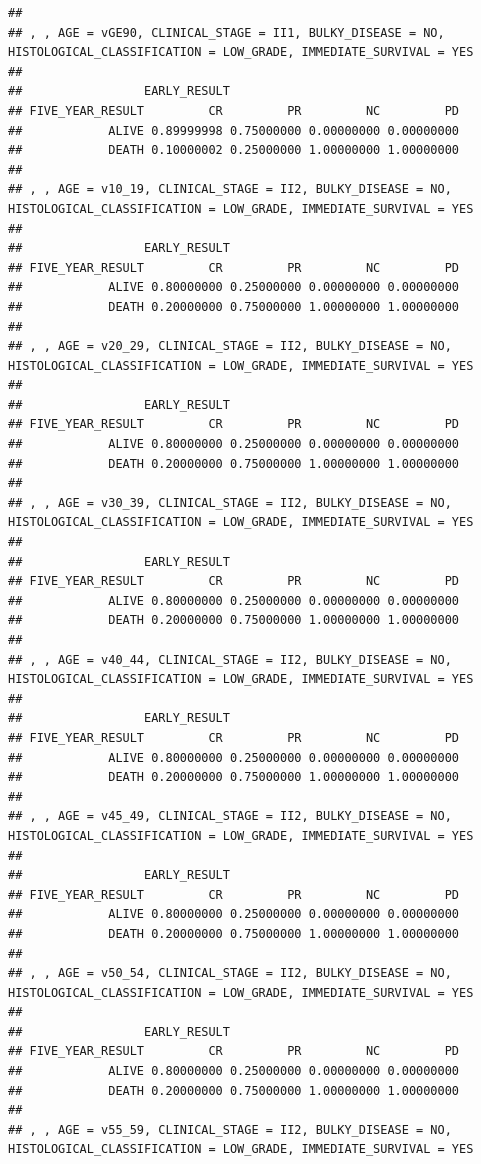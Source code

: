 \documentclass[]{article}
\begin{document}
\begin{verbatim}
## 
## , , AGE = vGE90, CLINICAL_STAGE = II1, BULKY_DISEASE = NO, HISTOLOGICAL_CLASSIFICATION = LOW_GRADE, IMMEDIATE_SURVIVAL = YES
## 
##                 EARLY_RESULT
## FIVE_YEAR_RESULT         CR         PR         NC         PD
##            ALIVE 0.89999998 0.75000000 0.00000000 0.00000000
##            DEATH 0.10000002 0.25000000 1.00000000 1.00000000
## 
## , , AGE = v10_19, CLINICAL_STAGE = II2, BULKY_DISEASE = NO, HISTOLOGICAL_CLASSIFICATION = LOW_GRADE, IMMEDIATE_SURVIVAL = YES
## 
##                 EARLY_RESULT
## FIVE_YEAR_RESULT         CR         PR         NC         PD
##            ALIVE 0.80000000 0.25000000 0.00000000 0.00000000
##            DEATH 0.20000000 0.75000000 1.00000000 1.00000000
## 
## , , AGE = v20_29, CLINICAL_STAGE = II2, BULKY_DISEASE = NO, HISTOLOGICAL_CLASSIFICATION = LOW_GRADE, IMMEDIATE_SURVIVAL = YES
## 
##                 EARLY_RESULT
## FIVE_YEAR_RESULT         CR         PR         NC         PD
##            ALIVE 0.80000000 0.25000000 0.00000000 0.00000000
##            DEATH 0.20000000 0.75000000 1.00000000 1.00000000
## 
## , , AGE = v30_39, CLINICAL_STAGE = II2, BULKY_DISEASE = NO, HISTOLOGICAL_CLASSIFICATION = LOW_GRADE, IMMEDIATE_SURVIVAL = YES
## 
##                 EARLY_RESULT
## FIVE_YEAR_RESULT         CR         PR         NC         PD
##            ALIVE 0.80000000 0.25000000 0.00000000 0.00000000
##            DEATH 0.20000000 0.75000000 1.00000000 1.00000000
## 
## , , AGE = v40_44, CLINICAL_STAGE = II2, BULKY_DISEASE = NO, HISTOLOGICAL_CLASSIFICATION = LOW_GRADE, IMMEDIATE_SURVIVAL = YES
## 
##                 EARLY_RESULT
## FIVE_YEAR_RESULT         CR         PR         NC         PD
##            ALIVE 0.80000000 0.25000000 0.00000000 0.00000000
##            DEATH 0.20000000 0.75000000 1.00000000 1.00000000
## 
## , , AGE = v45_49, CLINICAL_STAGE = II2, BULKY_DISEASE = NO, HISTOLOGICAL_CLASSIFICATION = LOW_GRADE, IMMEDIATE_SURVIVAL = YES
## 
##                 EARLY_RESULT
## FIVE_YEAR_RESULT         CR         PR         NC         PD
##            ALIVE 0.80000000 0.25000000 0.00000000 0.00000000
##            DEATH 0.20000000 0.75000000 1.00000000 1.00000000
## 
## , , AGE = v50_54, CLINICAL_STAGE = II2, BULKY_DISEASE = NO, HISTOLOGICAL_CLASSIFICATION = LOW_GRADE, IMMEDIATE_SURVIVAL = YES
## 
##                 EARLY_RESULT
## FIVE_YEAR_RESULT         CR         PR         NC         PD
##            ALIVE 0.80000000 0.25000000 0.00000000 0.00000000
##            DEATH 0.20000000 0.75000000 1.00000000 1.00000000
## 
## , , AGE = v55_59, CLINICAL_STAGE = II2, BULKY_DISEASE = NO, HISTOLOGICAL_CLASSIFICATION = LOW_GRADE, IMMEDIATE_SURVIVAL = YES

\end{verbatim}
\end{document}

